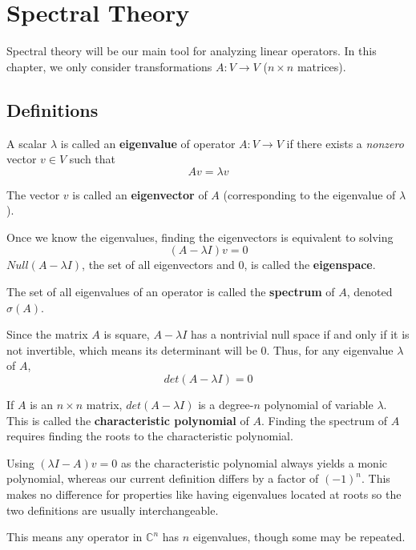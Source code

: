 \chapter{Spectral Theory}
Spectral theory will be our main tool for analyzing linear operators. In this chapter, we only consider transformations $A: V \rightarrow V$ ($n \times n$ matrices). 

\section{Definitions}

\begin{definition}
A scalar $\lambda$ is called an \textbf{eigenvalue} of operator $A: V \rightarrow V$ if there exists a \textit{nonzero} vector $v \in V$ such that 
$$Av = \lambda v$$

The vector $v$ is called an \textbf{eigenvector} of $A$ (corresponding to the eigenvalue of $\lambda$).

Once we know the eigenvalues, finding the eigenvectors is equivalent to solving 
$$(A - \lambda I)v = 0$$
$Null(A - \lambda I)$, the set of all eigenvectors and 0, is called the \textbf{eigenspace}. 

The set of all eigenvalues of an operator is called the \textbf{spectrum} of $A$, denoted $\sigma (A)$. 
\end{definition}

Since the matrix $A$ is square, $A - \lambda I$ has a nontrivial null space if and only if it is not invertible, which means its determinant will be 0. Thus, for any eigenvalue $\lambda$ of $A$, 
$$det(A - \lambda I) = 0$$

\begin{definition}
If $A$ is an $n \times n$ matrix, $det(A - \lambda I)$ is a degree-$n$ polynomial of variable $\lambda$. This is called the \textbf{characteristic polynomial} of $A$. Finding the spectrum of $A$ requires finding the roots to the characteristic polynomial. 

Using $(\lambda I - A)v = 0$ as the characteristic polynomial always yields a monic polynomial, whereas our current definition differs by a factor of $(-1)^{n}$. This makes no difference for properties like having eigenvalues located at roots so the two definitions are usually interchangeable. 

This means any operator in $\mathbb{C}^{n}$ has $n$ eigenvalues, though some may be repeated. 
\end{definition}


